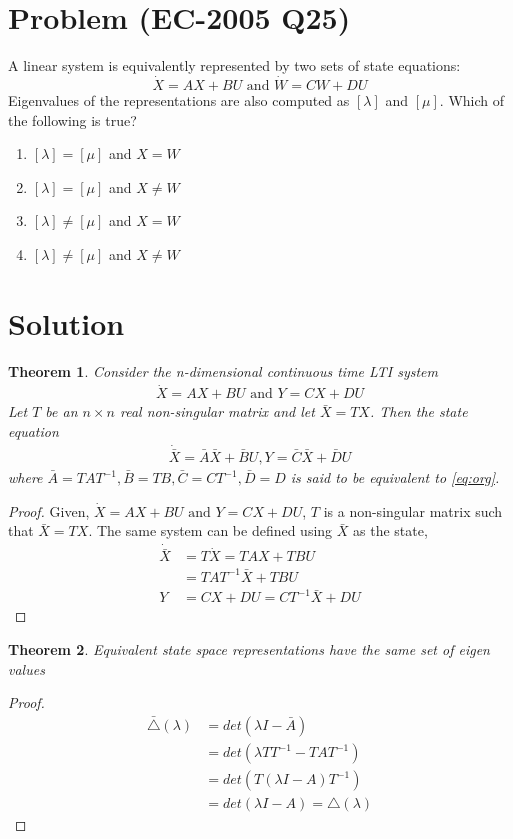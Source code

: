 \documentclass[journal,12pt,twocolumn]{IEEEtran}
\newtheorem{theorem}{Theorem}[section]
\begin{document}
\section{Problem (EC-2005 Q25)}
A linear system is equivalently represented by two sets of state equations:
$$\dot X=AX+BU \text{ and } \dot W=CW+DU$$
Eigenvalues of the representations are also computed as $[\lambda]$ and $[\mu]$. Which of the following is true?
\begin{enumerate}
    \item $[\lambda]=[\mu]$ and $X=W$
    \item $[\lambda]=[\mu]$ and $X\neq W$
    \item $[\lambda]\neq [\mu]$ and $X=W$
    \item $[\lambda]\neq[\mu]$ and $X\neq W$
\end{enumerate}
\section{Solution}
\begin{theorem}
Consider the n-dimensional continuous time LTI system
\begin{align}
    \dot X=AX+BU \text{ and } Y=CX+DU
    \label{eq:org}
\end{align}
Let $T$ be an $n\times n$ real non-singular matrix and let $\bar X= TX$. Then the state equation 
\begin{align}
    \dot{\bar X}=\bar A\bar X+ \bar BU, Y=\bar C\bar X+\bar DU
\end{align}
where $\bar A=TAT^{-1}, \bar B=TB, \bar C=CT^{-1}, \bar D=D$ is said to be equivalent to \eqref{eq:org}.
\label{eq:th1}
\end{theorem}
\begin{proof}
Given, $\dot X=AX+BU \text{ and } Y=CX+DU$, $T$ is a non-singular matrix such that $\bar X= TX$. The same system can be defined using $\bar X$ as the state,
\begin{align}
    \dot{\bar X}&=T\dot X=TAX+TBU\\
    &=TAT^{-1}\bar X+TBU\\
    Y&=CX+DU=CT^{-1}\bar X+DU
\end{align}
\end{proof}
\begin{theorem}
Equivalent state space representations have the same set of eigen values
\label{eq:th2}
\end{theorem}
\begin{proof}
\begin{align}
    \bar\triangle(\lambda)&=det(\lambda I-\bar A)\\
    &=det(\lambda TT^{-1}-TAT^{-1})\\
    &=det(T(\lambda I-A)T^{-1})\\
    &=det(\lambda I-A)=\triangle(\lambda)
\end{align}
\end{proof}
\end{document}
